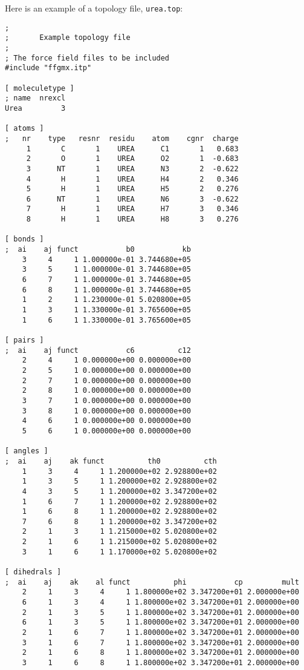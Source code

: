 Here is an example of a topology file, {\tt urea.top}:
{\small\begin{verbatim}
;
;       Example topology file
;
; The force field files to be included
#include "ffgmx.itp"

[ moleculetype ]
; name  nrexcl
Urea         3

[ atoms ]
;   nr    type   resnr  residu    atom    cgnr  charge
     1       C       1    UREA      C1       1   0.683
     2       O       1    UREA      O2       1  -0.683
     3      NT       1    UREA      N3       2  -0.622
     4       H       1    UREA      H4       2   0.346
     5       H       1    UREA      H5       2   0.276
     6      NT       1    UREA      N6       3  -0.622
     7       H       1    UREA      H7       3   0.346
     8       H       1    UREA      H8       3   0.276

[ bonds ]
;  ai    aj funct           b0           kb
    3     4     1 1.000000e-01 3.744680e+05 
    3     5     1 1.000000e-01 3.744680e+05 
    6     7     1 1.000000e-01 3.744680e+05 
    6     8     1 1.000000e-01 3.744680e+05 
    1     2     1 1.230000e-01 5.020800e+05 
    1     3     1 1.330000e-01 3.765600e+05 
    1     6     1 1.330000e-01 3.765600e+05 

[ pairs ]
;  ai    aj funct           c6          c12
    2     4     1 0.000000e+00 0.000000e+00 
    2     5     1 0.000000e+00 0.000000e+00 
    2     7     1 0.000000e+00 0.000000e+00 
    2     8     1 0.000000e+00 0.000000e+00 
    3     7     1 0.000000e+00 0.000000e+00 
    3     8     1 0.000000e+00 0.000000e+00 
    4     6     1 0.000000e+00 0.000000e+00 
    5     6     1 0.000000e+00 0.000000e+00 

[ angles ]
;  ai    aj    ak funct          th0          cth
    1     3     4     1 1.200000e+02 2.928800e+02 
    1     3     5     1 1.200000e+02 2.928800e+02 
    4     3     5     1 1.200000e+02 3.347200e+02 
    1     6     7     1 1.200000e+02 2.928800e+02 
    1     6     8     1 1.200000e+02 2.928800e+02 
    7     6     8     1 1.200000e+02 3.347200e+02 
    2     1     3     1 1.215000e+02 5.020800e+02 
    2     1     6     1 1.215000e+02 5.020800e+02 
    3     1     6     1 1.170000e+02 5.020800e+02 

[ dihedrals ]
;  ai    aj    ak    al funct          phi           cp         mult
    2     1     3     4     1 1.800000e+02 3.347200e+01 2.000000e+00 
    6     1     3     4     1 1.800000e+02 3.347200e+01 2.000000e+00 
    2     1     3     5     1 1.800000e+02 3.347200e+01 2.000000e+00 
    6     1     3     5     1 1.800000e+02 3.347200e+01 2.000000e+00 
    2     1     6     7     1 1.800000e+02 3.347200e+01 2.000000e+00 
    3     1     6     7     1 1.800000e+02 3.347200e+01 2.000000e+00 
    2     1     6     8     1 1.800000e+02 3.347200e+01 2.000000e+00 
    3     1     6     8     1 1.800000e+02 3.347200e+01 2.000000e+00 


\end{verbatim}}
